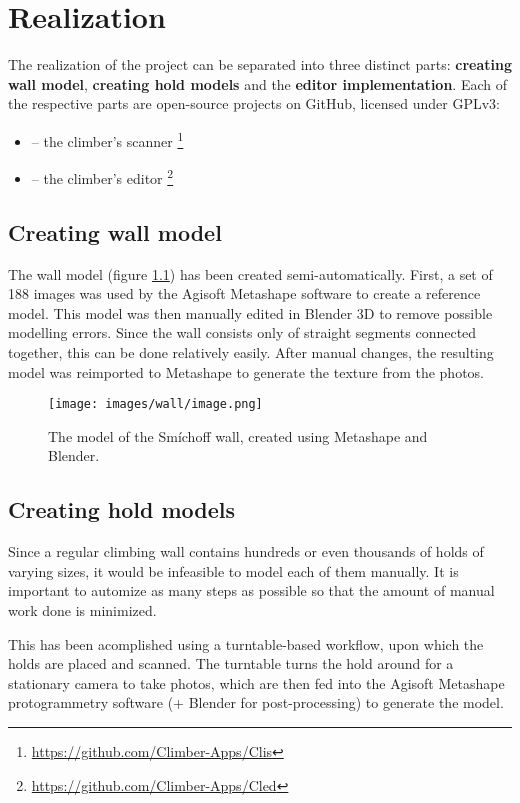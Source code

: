 \chapter{Realization}

The realization of the project can be separated into three distinct parts: \textbf{creating wall model}, \textbf{creating hold models} and the \textbf{editor implementation}.
Each of the respective parts are open-source projects on GitHub, licensed under GPLv3:
\begin{itemize}
	\item \raisebox{-0.08em}{} -- the climber's scanner \footnote{\url{https://github.com/Climber-Apps/Clis}}
	\item \raisebox{-0.08em}{} -- the climber's editor \footnote{\url{https://github.com/Climber-Apps/Cled}}
\end{itemize}

\section{Creating wall model}
The wall model (figure \ref{fig:model}) has been created semi-automatically.
First, a set of 188 images was used by the Agisoft Metashape software to create a reference model.
This model was then manually edited in Blender 3D to remove possible modelling errors.
Since the wall consists only of straight segments connected together, this can be done relatively easily.
After manual changes, the resulting model was reimported to Metashape to generate the texture from the photos.

\begin{figure}[H]
	\centering
	\texttt{[image: images/wall/image.png]}
	\caption{The model of the Smíchoff wall, created using Metashape and Blender.}
	\label{fig:model}
\end{figure}


\section{Creating hold models}
Since a regular climbing wall contains hundreds or even thousands of holds of varying sizes, it would be infeasible to model each of them manually.
It is important to automize as many steps as possible so that the amount of manual work done is minimized.

This has been acomplished using a turntable-based workflow, upon which the holds are placed and scanned.
The turntable turns the hold around for a stationary camera to take photos, which are then fed into the Agisoft Metashape protogrammetry software (+ Blender for post-processing) to generate the model.

